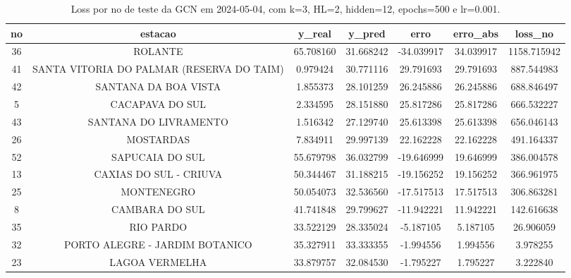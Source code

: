 \begin{table}[h]
\centering
\caption{Loss por no de teste da GCN em 2024-05-04, com k=3, HL=2, hidden=12, epochs=500 e lr=0.001.}
\label{tab:gcn_loss_k3_hl2_h12_e500_d20240504}
\begin{tabular}{ccccccc}
\toprule
no & estacao & y\_real & y\_pred & erro & erro\_abs & loss\_no \\
\midrule
36 & ROLANTE & 65.708160 & 31.668242 & -34.039917 & 34.039917 & 1158.715942 \\
41 & SANTA VITORIA DO PALMAR (RESERVA DO TAIM) & 0.979424 & 30.771116 & 29.791693 & 29.791693 & 887.544983 \\
42 & SANTANA DA BOA VISTA & 1.855373 & 28.101259 & 26.245886 & 26.245886 & 688.846497 \\
5 & CACAPAVA DO SUL & 2.334595 & 28.151880 & 25.817286 & 25.817286 & 666.532227 \\
43 & SANTANA DO LIVRAMENTO & 1.516342 & 27.129740 & 25.613398 & 25.613398 & 656.046143 \\
26 & MOSTARDAS & 7.834911 & 29.997139 & 22.162228 & 22.162228 & 491.164337 \\
52 & SAPUCAIA DO SUL & 55.679798 & 36.032799 & -19.646999 & 19.646999 & 386.004578 \\
13 & CAXIAS DO SUL - CRIUVA & 50.344467 & 31.188215 & -19.156252 & 19.156252 & 366.961975 \\
25 & MONTENEGRO & 50.054073 & 32.536560 & -17.517513 & 17.517513 & 306.863281 \\
8 & CAMBARA DO SUL & 41.741848 & 29.799627 & -11.942221 & 11.942221 & 142.616638 \\
35 & RIO PARDO & 33.522129 & 28.335024 & -5.187105 & 5.187105 & 26.906059 \\
32 & PORTO ALEGRE - JARDIM BOTANICO & 35.327911 & 33.333355 & -1.994556 & 1.994556 & 3.978255 \\
23 & LAGOA VERMELHA & 33.879757 & 32.084530 & -1.795227 & 1.795227 & 3.222840 \\
\bottomrule
\end{tabular}
\end{table}
